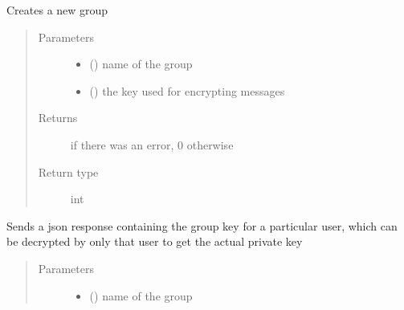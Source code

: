 \documentclass[letterpaper,10pt,english]{sphinxmanual}
\begin{document}
\begin{fulllineitems}
\begin{fulllineitems}
\label{\detokenize{Message:Message.Message._create_grp}}
Creates a new group
\begin{quote}\begin{description}
\item[{Parameters}] \leavevmode\begin{itemize}
\item {} 
 () \textendash{} name of the group

\item {} 
 () \textendash{} the key used for encrypting messages

\end{itemize}

\item[{Returns}]  if there was an error, 0 otherwise

\item[{Return type}] \leavevmode
int

\end{description}\end{quote}

\end{fulllineitems}


\begin{fulllineitems}
\label{\detokenize{Message:Message.Message._send_group_key}}
Sends a json response containing the group key for a particular user, which can be decrypted by only that user to get the actual private key
\begin{quote}\begin{description}
\item[{Parameters}] \leavevmode\begin{itemize}
\item {} 
 () \textendash{} name of the group


\end{itemize}
\end{description}
\end{quote}
\end{fulllineitems}
\end{fulllineitems}
\end{document}
